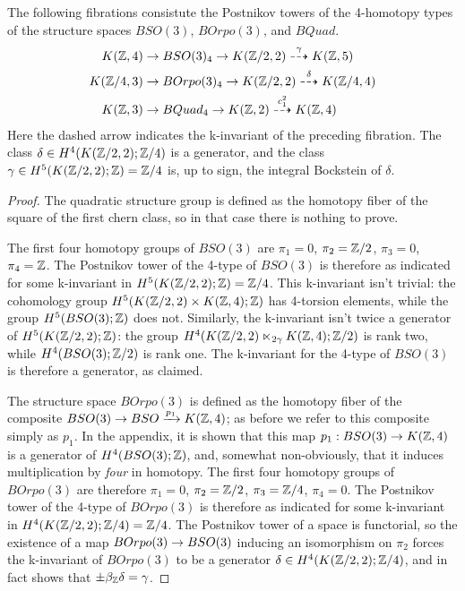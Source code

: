\documentclass{amsart}
\begin{document}
\begin{proposition}
The following fibrations consistute the Postnikov towers of the 4-homotopy types of the structure spaces $BSO(3)$, $BOrpo(3)$, and $BQuad$.
\begin{align}
K(\mathbb Z,4) \rightarrow & \; BSO(3)_4 \rightarrow K(\mathbb Z/2,2) \overset{\gamma}{\dashrightarrow} K(\mathbb Z,5) \nonumber \\
K(\mathbb Z/4,3) \rightarrow & \; BOrpo(3)_4 \rightarrow K(\mathbb Z/2,2) \overset{\delta}{\dashrightarrow} K(\mathbb Z/4,4) \nonumber \\
K(\mathbb Z,3) \rightarrow & \; BQuad_4 \rightarrow K(\mathbb Z,2) \overset{c_1^2}{\dashrightarrow} K(\mathbb Z,4) \nonumber
\end{align}
\nid Here the dashed arrow indicates the k-invariant of the preceding fibration.  The class $\delta \in H^4(K(\mathbb Z/2,2);\mathbb Z/4)$ is a generator, and the class $\gamma \in H^5(K(\mathbb Z/2,2);\mathbb Z) = \mathbb Z/4$ is, up to sign, the integral Bockstein of $\delta$. %
\end{proposition}

\begin{proof}
The quadratic structure group is defined as the homotopy fiber of the square of the first chern class, so in that case there is nothing to prove.

The first four homotopy groups of $BSO(3)$ are $\pi_1 = 0$, $\pi_2 = \mathbb Z/2$, $\pi_3 = 0$, $\pi_4 = \mathbb Z$.  The Postnikov tower of the 4-type of $BSO(3)$ is therefore as indicated for some k-invariant in $H^5(K(\mathbb Z/2,2);\mathbb Z) = \mathbb Z/4$.  This k-invariant isn't trivial: the cohomology group $H^5(K(\mathbb Z/2,2) \times K(\mathbb Z,4);\mathbb Z)$ has 4-torsion elements, while the group $H^5(BSO(3);\mathbb Z)$ does not.  Similarly, the k-invariant isn't twice a generator of $H^5(K(\mathbb Z/2,2);\mathbb Z)$: the group $H^4(K(\mathbb Z/2,2) \ltimes_{2\gamma} K(\mathbb Z,4);\mathbb Z/2)$ is rank two, while $H^4(BSO(3);\mathbb Z/2)$ is rank one.  The k-invariant for the 4-type of $BSO(3)$ is therefore a generator, as claimed.

The structure space $BOrpo(3)$ is defined as the homotopy fiber of the composite $BSO(3) \rightarrow BSO \xrightarrow{p_1} K(\mathbb Z,4)$; as before we refer to this composite simply as $p_1$.  In the appendix, it is shown that this map $p_1: BSO(3) \rightarrow K(\mathbb Z,4)$ is a generator of $H^4(BSO(3);\mathbb Z)$, and, somewhat non-obviously, that it induces multiplication by \emph{four} in homotopy.  The first four homotopy groups of $BOrpo(3)$ are therefore $\pi_1 = 0$, $\pi_2 = \mathbb Z/2$, $\pi_3 = \mathbb Z/4$, $\pi_4 = 0$.  The Postnikov tower of the 4-type of $BOrpo(3)$ is therefore as indicated for some k-invariant in $H^4(K(\mathbb Z/2,2);\mathbb Z/4) = \mathbb Z/4$.  The Postnikov tower of a space is functorial, so the existence of a map $BOrpo(3) \rightarrow BSO(3)$ inducing an isomorphism on $\pi_2$ forces the k-invariant of $BOrpo(3)$ to be a generator $\delta \in H^4(K(\mathbb Z/2,2);\mathbb Z/4)$, and in fact shows that $\pm \beta_{\mathbb Z} \delta = \gamma$. 
\end{proof}
\end{document}
